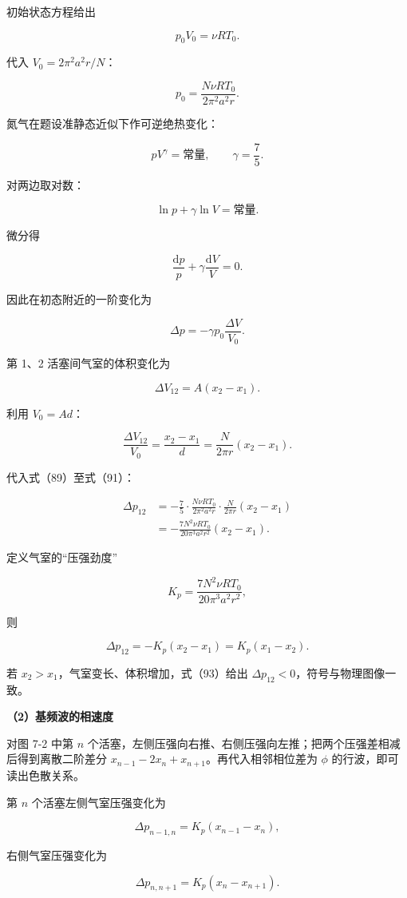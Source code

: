 \documentclass[12pt,a4paper,UTF8]{ctexart}
\begin{document}
初始状态方程给出

\[p_0V_0=\nu RT_0.\]

代入 \(V_0=2\pi^2a^2r/N\)：

\[p_0=\frac{N\nu RT_0}{2\pi^2a^2r}. \tag{89}\]

氮气在题设准静态近似下作可逆绝热变化：

\[pV^\gamma=\text{常量},\qquad \gamma=\frac75.\]

对两边取对数：

\[\ln p+\gamma\ln V=\text{常量}.\]

微分得

\[\frac{\mathrm dp}{p}+\gamma\frac{\mathrm dV}{V}=0.\]

因此在初态附近的一阶变化为

\[\Delta p=-\gamma p_0\frac{\Delta V}{V_0}. \tag{90}\]

第 1、2 活塞间气室的体积变化为

\[\Delta V_{12}=A(x_2-x_1).\]

利用 \(V_0=Ad\)：

\[\frac{\Delta V_{12}}{V_0}
=\frac{x_2-x_1}{d}
=\frac{N}{2\pi r}(x_2-x_1). \tag{91}\]

代入式（89）至式（91）：

\[\begin{aligned}
\Delta p_{12}
&=-\frac75\cdot
\frac{N\nu RT_0}{2\pi^2a^2r}
\cdot\frac{N}{2\pi r}(x_2-x_1)\\
&=-\frac{7N^2\nu RT_0}{20\pi^3a^2r^2}(x_2-x_1).
\end{aligned}\]

定义气室的``压强劲度''

\[K_p=\frac{7N^2\nu RT_0}{20\pi^3a^2r^2}, \tag{92}\]

则

\[\boxed{\Delta p_{12}=-K_p(x_2-x_1)=K_p(x_1-x_2)}. \tag{93}\]

若 \(x_2>x_1\)，气室变长、体积增加，式（93）给出
\(\Delta p_{12}<0\)，符号与物理图像一致。

\textbf{（2）基频波的相速度}

对图 7-2 中第 \(n\)
个活塞，左侧压强向右推、右侧压强向左推；把两个压强差相减后得到离散二阶差分
\(x_{n-1}-2x_n+x_{n+1}\)。再代入相邻相位差为 \(\phi\)
的行波，即可读出色散关系。

第 \(n\) 个活塞左侧气室压强变化为

\[\Delta p_{n-1,n}=K_p(x_{n-1}-x_n),\]

右侧气室压强变化为

\[\Delta p_{n,n+1}=K_p(x_n-x_{n+1}).\]
\end{document}

